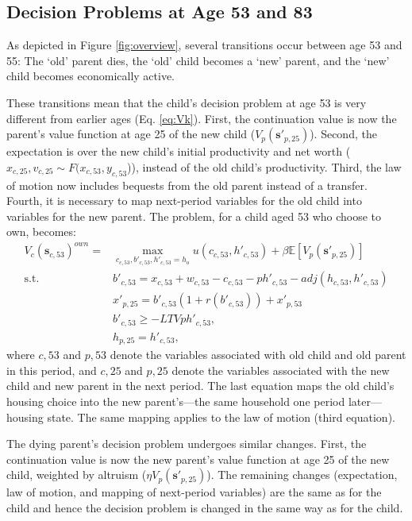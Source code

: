 \documentclass[12pt]{article}
\newcommand{\E}{\mathbb{E}}
\begin{document}
\subsection{Decision Problems at Age 53 and 83}\label{sec:decextra}
As depicted in Figure \ref{fig:overview}, several transitions occur between age 53 and 55: The `old' parent dies, the `old' child becomes a `new' parent, and the `new' child becomes economically active. 

These transitions mean that the child's decision problem at age 53 is very different from earlier ages (Eq. \ref{eq:Vk}). First, the continuation value is now the parent's value function at age 25 of the new child ($V_{p}({\mathbf{s}'_{p,25}})$). Second, the expectation is over the new child's initial productivity and net worth ($x_{c,25},v_{c,25}\sim F(x_{c,53},y_{c,53}$)), instead of the old child's productivity. Third, the law of motion now includes bequests from the old parent instead of a transfer. Fourth, it is necessary to map next-period variables for the old child into variables for the new parent. The problem, for a child aged 53 who choose to own, becomes:
\begin{equation*}
\begin{split}
V_c(\mathbf{s}_{c,53})^{own} = &\max_{c_{c,53},b'_{c,53},h'_{c,53}=h_o} u(c_{c,53},h'_{c,53}) + \beta \E\left[V_{p}({\mathbf{s}'_{p,25}}) \right] \\
\text{s.t.}\quad & 	b'_{c,53} = x_{c,53} + w_{c,53} - c_{c,53} - p h'_{c,53} - adj(h_{c,53},h'_{c,53}) \\
& x'_{p,25} = b'_{c,53}(1+r(b'_{c,53})) + x'_{p,53} \\
& b'_{c,53} \ge -LTV p h'_{c,53}, \\
& h_{p,25} = h'_{c,53},
\end{split}
\end{equation*} 
where $c,53$ and $p,53$ denote the variables associated with old child and old parent in this period, and $c,25$ and $p,25$ denote the variables associated with the new child and new parent in the next period. The last equation maps the old child's housing choice into the new parent's---the same household one period later---housing state. The same mapping applies to the law of motion (third equation).

The dying parent's decision problem undergoes similar changes. First, the continuation value is now the new parent's value function at age 25 of the new child, weighted by altruism ($\eta V_p(\mathbf{s}'_{p,25})$). The remaining changes (expectation, law of motion, and mapping of next-period variables) are the same as for the child and hence the decision problem is changed in the same way as for the child.
\end{document}
